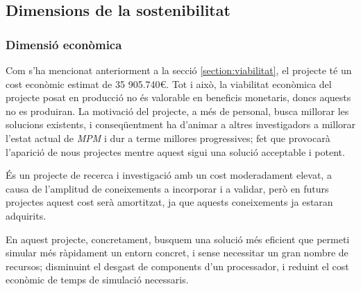 \documentclass[a4paper]{article} %
\begin{document}
	\subsection{Dimensions de la sostenibilitat}
	\subsubsection{Dimensió econòmica}
	Com s'ha mencionat anteriorment a la secció \ref{section:viabilitat}, el projecte té un cost econòmic estimat de 35 905.740\euro. Tot i això, la viabilitat econòmica del projecte posat en producció no és valorable en beneficis monetaris, doncs aquests no es produiran. La motivació del projecte, a més de personal, busca millorar les solucions existents, i conseqüentment ha d'animar a altres investigadors a millorar l'estat actual de \textit{MPM} i dur a terme millores progressives; fet que provocarà l'aparició de nous projectes mentre aquest sigui una solució acceptable i potent. \par
	És un projecte de recerca i investigació amb un cost moderadament elevat, a causa de l'amplitud de coneixements a incorporar i a validar, però en futurs projectes aquest cost serà amortitzat, ja que aquests coneixements ja estaran adquirits. \par
	En aquest projecte, concretament, busquem una solució més eficient que permeti simular més ràpidament un entorn concret, i sense necessitar un gran nombre de recursos; disminuint el desgast de components d'un processador, i reduint el cost econòmic de temps de simulació necessaris.
	
\end{document}
